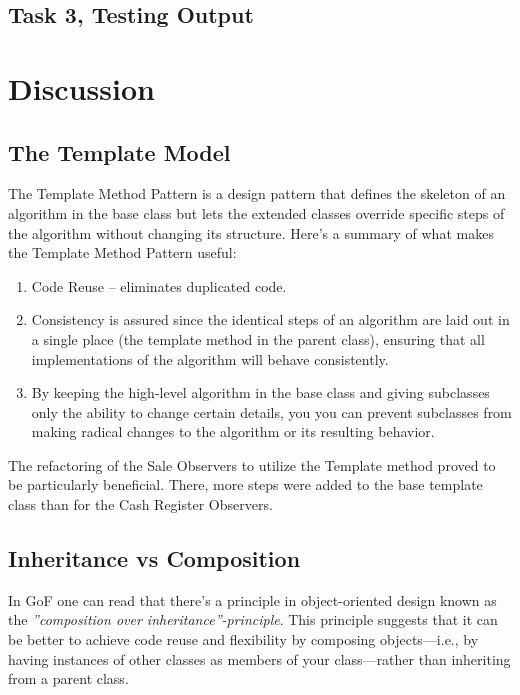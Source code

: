 \documentclass[a4paper]{scrreprt}
\newenvironment{longlisting}{\captionsetup{type=listing}}{}
\begin{document}
\section*{Task 3, Testing Output}


\chapter{Discussion}
\label{sec:discussion}
\section*{The Template Model}
The Template Method Pattern is a design pattern that defines the skeleton of an algorithm in the base class but lets the extended classes override specific steps of the algorithm without changing its structure.
Here's a summary of what makes the Template Method Pattern useful:
\begin{enumerate}
    \item Code Reuse -- eliminates duplicated code.
    \item Consistency is assured since the identical steps of an algorithm are laid out in a single place (the template method in the parent class), ensuring that all implementations of the algorithm will behave consistently.
    \item By keeping the high-level algorithm in the base class and giving subclasses only the ability to change certain details, you you can prevent subclasses from making radical changes to the algorithm or its resulting behavior.
\end{enumerate}
The refactoring of the Sale Observers to utilize the Template method proved to be particularly beneficial.
There, more steps were added to the base template class than for the Cash Register Observers.

\section*{Inheritance vs Composition}
In GoF one can read that there's a principle in object-oriented design known as the
\emph{''composition over inheritance''-principle}.
This principle suggests that it can be better to achieve code reuse and flexibility by composing objects—i.e., by having instances of other classes as members of your class—rather than inheriting from a parent class.
\end{document}
